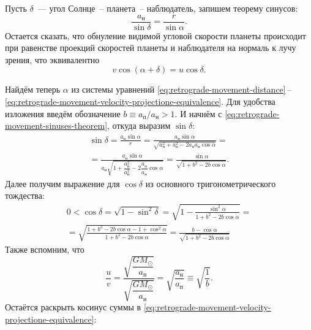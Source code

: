 Пусть $\delta$~--- угол Солнце~-- планета~-- наблюдатель, запишем теорему синусов:
\begin{equation}
    \frac{a_\text{н}}{\sin \delta} = \frac{r}{\sin \alpha}.
    \label{eq:retrograde-movement-sinuses-theorem}
\end{equation}
Остается сказать, что обнуление видимой угловой скорости планеты происходит при равенстве проекций скоростей планеты и наблюдателя на нормаль к лучу зрения, что эквивалентно
\begin{equation}
    v \cos (\alpha + \delta) = u \cos \delta.
    \label{eq:retrograde-movement-velocity-projectione-equivalence}
\end{equation}

Найдём теперь $\alpha$ из системы уравнений \eqref{eq:retrograde-movement-distance}\,--\,\eqref{eq:retrograde-movement-velocity-projectione-equivalence}. Для удобства изложения введём обозначение $b \equiv a_\text{п} / a_\text{н} > 1$. И начнём с \eqref{eq:retrograde-movement-sinuses-theorem}, откуда выразим $\sin \delta$:
\begin{multline*}
    \sin \delta 
        = \frac{a_\text{н} \sin \alpha}{r} 
        = \frac{a_\text{н} \sin \alpha}{\sqrt{a_\text{п}^2 + a_\text{н}^2 - 2 a_\text{п} a_\text{н} \cos \alpha}} = \\
        =  \frac{a_\text{н} \sin \alpha}{a_\text{н} \sqrt{1 + \dfrac{a_\text{п}^2}{a_\text{н}^2} - 2 \dfrac{a_\text{п}}{a_\text{н}} \cos \alpha}}
        = \frac{\sin \alpha}{\sqrt{1 + b^2 - 2 b \cos \alpha}}.
\end{multline*}
Далее получим выражение для $\cos \delta$ из основного тригонометрического тождества:
\begin{multline*}
    0 < \cos \delta 
        = \sqrt{1 - \sin^2 \delta} 
        = \sqrt{1 - \frac{\sin^2 \alpha}{1 + b^2 - 2 b \cos \alpha}} = \\
        = \sqrt{\frac{1 + b^2 - 2 b \cos \alpha - 1 + \cos^2 \alpha}{1 + b^2 - 2 b \cos \alpha}}
        = \frac{b - \cos \alpha}{\sqrt{1 + b^2 - 2 b \cos \alpha}}
\end{multline*}
Также вспомним, что
\begin{equation*}
    \frac{u}{v} = \frac{\sqrt{\dfrac{GM_\odot}{a_\text{п}}}}{\sqrt{\dfrac{GM_\odot}{a_\text{н}}}} = \sqrt{\frac{a_\text{н}}{a_\text{п}}} \equiv \sqrt{\frac{1}{b}}.
\end{equation*}
Остаётся раскрыть косинус суммы в \eqref{eq:retrograde-movement-velocity-projectione-equivalence}:
